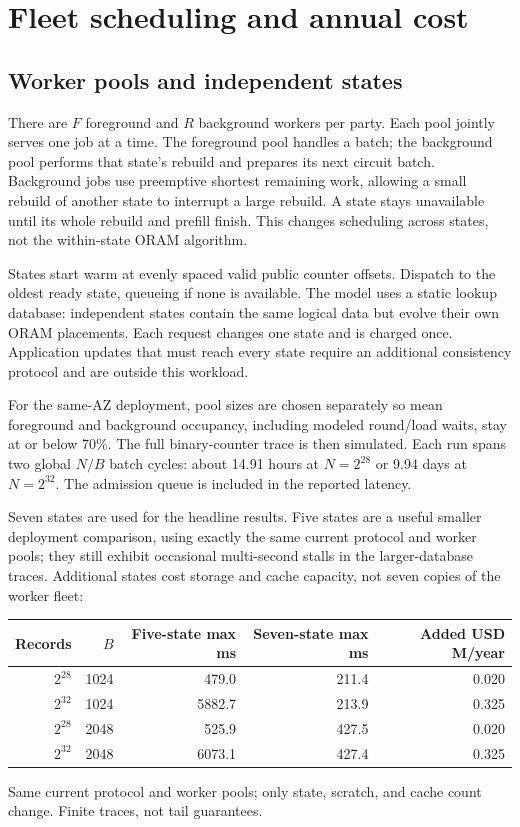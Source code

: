 \documentclass[11pt]{article}
\begin{document}
\section{Fleet scheduling and annual cost}
\subsection{Worker pools and independent states}
There are $F$ foreground and $R$ background workers per party. Each pool
jointly serves one job at a time. The foreground pool handles a batch;
the background pool performs that state's rebuild and prepares its next
circuit batch. Background jobs use preemptive shortest remaining work,
allowing a small rebuild of another state to interrupt a large rebuild.
A state stays unavailable until its whole rebuild and prefill finish.
This changes scheduling across states, not the within-state ORAM algorithm.

States start warm at evenly spaced valid public counter offsets. Dispatch
to the oldest ready state, queueing if none is available. The model uses a
static lookup database: independent states contain the same logical data
but evolve their own ORAM placements. Each request changes one state and
is charged once. Application updates that must reach every state require
an additional consistency protocol and are outside this workload.

For the same-AZ deployment, pool sizes are chosen separately so mean foreground and background
occupancy, including modeled round/load waits, stay at or below 70\%.
The full binary-counter trace is then simulated. Each run spans two global
$N/B$ batch cycles: about 14.91 hours at $N=2^{28}$ or 9.94 days at
$N=2^{32}$. The admission queue is included in the reported latency.

Seven states are used for the headline results. Five states are a useful
smaller deployment comparison, using exactly the same current protocol
and worker pools; they still exhibit occasional multi-second stalls in
the larger-database traces. Additional states cost storage and cache
capacity, not seven copies of the worker fleet:

\begin{center}\footnotesize
\begin{tabular}{rrrrr}\toprule
Records & $B$ & Five-state max ms & Seven-state max ms & Added USD M/year\\\midrule
$2^{28}$ & 1024 & 479.0 & 211.4 & 0.020\\
$2^{32}$ & 1024 & 5882.7 & 213.9 & 0.325\\
$2^{28}$ & 2048 & 525.9 & 427.5 & 0.020\\
$2^{32}$ & 2048 & 6073.1 & 427.4 & 0.325\\
\bottomrule\end{tabular}\end{center}
{\footnotesize Same current protocol and worker pools; only state, scratch, and cache count change. Finite traces, not tail guarantees.\par}
\end{document}
